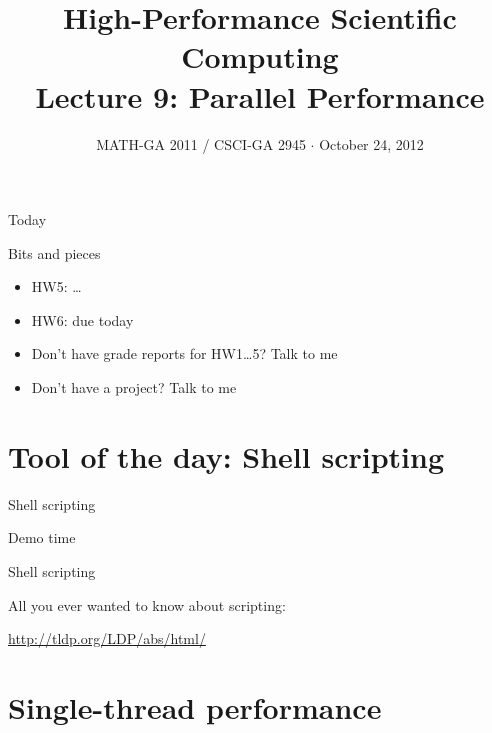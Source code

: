 \documentclass[english,compress]{beamer}
\begin{document}

\title{High-Performance Scientific Computing\\Lecture 9: Parallel Performance}

\date{MATH-GA 2011 / CSCI-GA 2945 $\cdot$ October 24, 2012}

\frame{\titlepage}

\begin{frame}{Today}
  \tableofcontents[hideallsubsections]
\end{frame}
\begin{frame}{Bits and pieces}
  \begin{itemize}
    \item HW5: \dots
    \item HW6: due today
    \item Don't have grade reports for HW1\dots5? Talk to me
    \item Don't have a project? Talk to me
  \end{itemize}
\end{frame}
\section[Software]{Tool of the day: Shell scripting}
\begin{frame}{Shell scripting}
  \begin{center}
  \Huge Demo time
  \end{center}
\end{frame}
\begin{frame}{Shell scripting}
  \begin{center}
    \Large
    All you ever wanted to know about scripting:

    \url{http://tldp.org/LDP/abs/html/}
  \end{center}
\end{frame}
\section{Single-thread performance}
\end{document}

